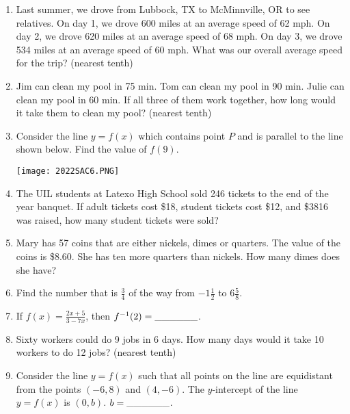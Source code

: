 \documentclass[../uilmath.tex]{subfiles}
\begin{document}
\begin{enumerate}[label=\bfseries\arabic*.]
    \item %
    Last summer, we drove from Lubbock, TX to McMinnville, OR to see relatives. On day 1, we drove 600 miles at an average speed of 
    62 mph. On day 2, we drove 620 miles at an average speed of 68 mph. On day 3, we drove 534 miles at an average speed of 60 mph. What was our overall average speed for the trip? (nearest tenth)

    \item %
    Jim can clean my pool in 75 min. Tom can clean my pool in 90 min. Julie can clean my pool in 60 min. If all three of them work together, how long would it take them to clean my pool? (nearest tenth)

    \item %
    Consider the line $y=f(x)$ which contains point $P$ and is parallel to the line shown below. Find the value of $f(9)$.

    \begin{center}
        \texttt{[image: 2022SAC6.PNG]}
    \end{center}

    \item %
    The UIL students at Latexo High School sold 246 tickets to the end of the year banquet. If adult tickets cost 
    \$18, student tickets cost \$12, and \$3816 was raised, how many student tickets were sold?

    \item %
    Mary has 57 coins that are either nickels, dimes or quarters. The value of the coins is \$8.60. She has ten more quarters than nickels. How many dimes does she have?

    \item %
    Find the number that is $\frac{3}{4}$ of the way from $-1\frac{1}{2}$ to $6\frac{5}{8}$.

    \item %
    If $f(x)=\frac{2x+5}{3-7x}$, then $f^{-1}(2)=\_\_\_\_\_\_$.

    \item %
    Sixty workers could do 9 jobs in 6 days. How many days would it take 10 workers to do 12 jobs? (nearest tenth)

    \item %
    Consider the line $y=f(x)$ such that all points on the line are equidistant from the points $(-6,8)$ and $(4,-6)$. The $y$-intercept of the line $y=f(x)$ is $(0,b)$. $b=\_\_\_\_\_\_$.


\end{enumerate}
\end{document}
